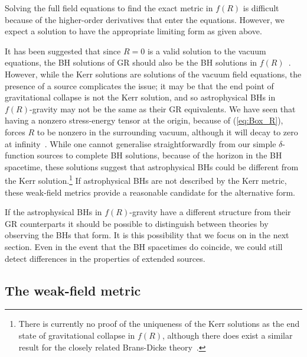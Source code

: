 \documentclass[aps,prd,amsfonts,amssymb,amsmath,nofootinbib,reprint,showpacs]{revtex4-1}
\newcommand{\eqnref}[1]{(\ref{eq:#1})}
\begin{document}
Solving the full field equations to find the exact metric in $f(R)$ is difficult because of the higher-order derivatives that enter the equations. However, we expect a solution to have the appropriate limiting form as given above.

It has been suggested that since $R = 0$ is a valid solution to the vacuum equations, the BH solutions of GR should also be the BH solutions in $f(R)$~\cite{Psaltis2008, Barausse2008}. However, while the Kerr solutions are solutions of the vacuum field equations, the presence of a source complicates the issue; it may be that the end point of gravitational collapse is not the Kerr solution, and so astrophysical BHs in $f(R)$-gravity may not be the same as their GR equivalents. We have seen that having a nonzero stress-energy tensor at the origin, because of \eqnref{Box_R}, forces $R$ to be nonzero in the surrounding vacuum, although it will decay to zero at infinity~\cite{Olmo2007c}. While one cannot generalise straightforwardly from our simple $\delta$-function sources to complete BH solutions, because of the horizon in the BH spacetime, these solutions suggest that astrophysical BHs could be different from the Kerr solution.\footnote{There is currently no proof of the uniqueness of the Kerr solutions as the end state of gravitational collapse in $f(R)$, although there does exist a similar result for the closely related Brans-Dicke theory~\cite{Hawking1972a, Bekenstein1978, Thorne1971, Scheel1995}.} If astrophysical BHs are not described by the Kerr metric, these weak-field metrics provide a reasonable candidate for the alternative form.

If the astrophysical BHs in $f(R)$-gravity have a different structure from their GR counterparts it should be possible to distinguish between theories by observing the BHs that form. It is this possibility that we focus on in the next section. Even in the event that the BH spacetimes do coincide, we could still detect differences in the properties of extended sources.

\subsection{The weak-field metric}
\end{document}
